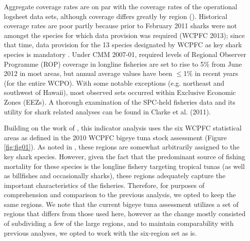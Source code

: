 \documentclass[12pt]{SCreport}
\begin{document}
Aggregate coverage rates are on par with the coverage rates of the operational logsheet data sets, although coverage differs greatly by region (). Historical coverage rates are poor partly because prior to February 2011 sharks were not amongst the species for which data provision was required (WCPFC 2013); since that time, data provision for the 13 species designated by WCPFC as key shark species is mandatory . Under CMM 2007-01, required levels of Regional Observer Programme (ROP) coverage in longline fisheries are set to rise to 5\% from June 2012 in most areas, but annual average values have been $\leq$1\% in recent years (for the entire WCPO). With some notable exceptions (e.g. northeast and southwest of Hawaii), most observed sets occurred within Exclusive Economic Zones (EEZs). A thorough examination of the SPC-held fisheries data and its utility for shark related analyses can be found in Clarke et al. (2011).

Building on the work of \citet{Clarke2011_a}, this indicator analysis uses the six WCPFC statistical areas as defined in the 2010 WCPFC bigeye tuna stock assessment (Figure \ref{fig:fig01}). As noted in \citet{Clarke2011_a}, these regions are somewhat arbitrarily assigned to the key shark species. However, given the fact that the predominant source of fishing mortality for these species is the longline fishery targeting tropical tunas (as well as billfishes and occasionally sharks), these regions adequately capture the important characteristics of the fisheries. Therefore, for purposes of comprehension and comparison to the previous analysis, we opted to keep the same regions. We note that the current bigeye tuna assessment utilizes a set of regions that differs from those used here, however as the change mostly consisted of subdividing a few of the large regions, and to maintain comparability with previous analyses, we opted to work with the six-region set as is.


\end{document}

